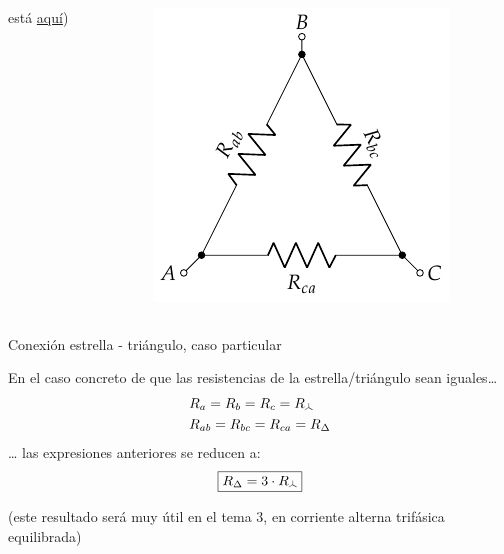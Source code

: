 \documentclass[aspectratio=169, xcolor={usenames,svgnames,dvipsnames}]{beamer}
\newcommand\wye{\scalerel*{\stackengine{-1pt}{%
  \rotatebox[origin=c]{30}{\rule{10pt}{.9pt}}\kern-1pt%
  \rotatebox[origin=c]{-30}{\rule{10pt}{1.3pt}}}{%
  \rule{.9pt}{10pt}}{O}{c}{F}{F}{S}}{\Delta}} %
\begin{document}
\begin{frame}
\begin{columns}
\begin{column}{0.4\columnwidth}
{    está \href{https://spinningnumbers.org/a/delta-wye-derivations.html\#text-y-to-delta-derivation-with-conductance}{aquí})}
    \end{column}
    \begin{column}{0.3\columnwidth}
    \begin{center}
    \includegraphics[width=.9\linewidth]{../figs/Conexion_Triangulo.pdf}
    \end{center}
    \end{column}
    \end{columns}
\end{frame}


\begin{frame}{Conexión estrella - triángulo, \hspace{3mm}caso particular}
    
    En el caso concreto de que las resistencias de la estrella/triángulo sean \alert{iguales}\ldots{}
    \begin{align*}
      &R_a=R_b=R_c=R_{\wye}\\
      & R_{ab}=R_{bc}=R_{ca}=R_{\Delta}
    \end{align*}
    \ldots{} las expresiones anteriores se reducen a:
    \begin{equation*}
      \boxed{R_{\Delta} = 3\cdot R_{\wye}}
    \end{equation*}
    
    \centering \small{(este resultado será muy útil en el tema 3, en \alert{corriente alterna trifásica} equilibrada)}
\end{frame}
\end{document}
